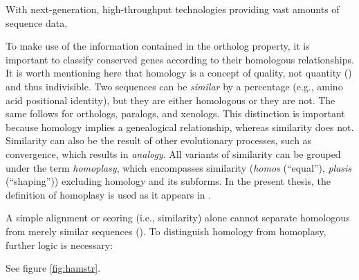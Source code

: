 With next-generation, high-throughput technologies providing vast amounts of
sequence data, 

To make use of the information contained in the ortholog property, it is
important to classify conserved genes according to their homologous
relationships. It is worth mentioning here that homology is a concept of
quality, not quantity (\cite{reeck1987}) and thus indivisible. Two sequences can
be \emph{similar} by a percentage (e.g., amino acid positional identity), but
they are either homologous or they are not. The same follows for orthologs,
paralogs, and xenologs. This distinction is important because homology implies a
genealogical relationship, whereas similarity does not. Similarity can also be
the result of other evolutionary processes, such as convergence, which results
in \emph{analogy}. All variants of similarity can be grouped under the term
\emph{homoplasy}, which encompasses similarity (\emph{homos} (``equal''),
\emph{plasis} (``shaping'')) excluding homology and its subforms. In the present
thesis, the definition of homoplasy is used as it appears in \cite{page1998}.

A simple alignment or scoring (i.e., similarity) alone cannot separate
homologous from merely similar sequences (\cite{eisen1998}). To distinguish
homology from homoplasy, further logic is necessary: 

See figure \ref{fig:hamstr}.
